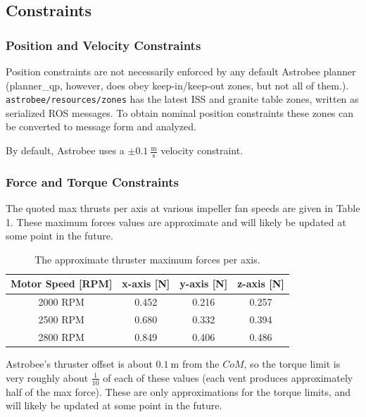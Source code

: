 \documentclass{article}
\begin{document}
\subsection{Constraints}
\subsubsection{Position and Velocity Constraints}

Position constraints are not necessarily enforced by any default Astrobee planner (planner\_qp, however, does obey keep-in/keep-out zones, but not all of them.). \texttt{astrobee/resources/zones} has the latest ISS and granite table zones, written as serialized ROS messages. To obtain nominal position constraints these zones can be converted to message form and analyzed.

By default, Astrobee uses a $\pm 0.1 \ \frac{\text{m}}{\text{s}}$ velocity constraint.

\subsubsection{Force and Torque Constraints}

The quoted max thrusts per axis at various impeller fan speeds are given in Table 1. These maximum forces values are approximate and will likely be updated at some point in the future.

\begin{table}[h!]
\centering
\begin{tabular}{ |c|c|c|c| } 
    \hline
    Motor Speed [RPM]& x-axis [N]& y-axis [N]& z-axis [N] \\
    \hline
    2000 RPM & 0.452 & 0.216 & 0.257 \\
     \hline
    2500 RPM & 0.680 & 0.332 & 0.394 \\
     \hline
    2800 RPM & 0.849 & 0.406 & 0.486 \\
     \hline
\end{tabular}
     \label{table:speeds}
     \caption{The approximate thruster maximum forces per axis.}
\end{table}

\noindent Astrobee's thruster offset is about $0.1\ \text{m}$ from the $CoM$, so the torque limit is very roughly about $\frac{1}{10}$ of each of these values (each vent produces approximately half of the max force). These are only approximations for the torque limits, and will likely be updated at some point in the future.
     
\end{document}
